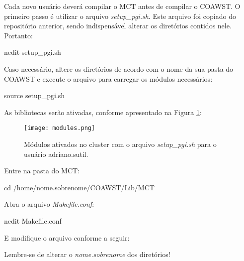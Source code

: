 \noindent Cada novo usuário deverá compilar o MCT antes de compilar o COAWST. O primeiro passo é utilizar o arquivo \textit{setup\_pgi.sh}. Este arquivo foi copiado do repositório anterior, sendo indispensável alterar os diretórios contidos nele.
Portanto:
\bigskip

\begin{bashcode}
nedit setup_pgi.sh
\end{bashcode}
\bigskip

\noindent Caso necessário, altere os diretórios de acordo com o nome da sua pasta do COAWST e execute o arquivo para carregar os módulos necessários:
\bigskip

\begin{bashcode}
source setup_pgi.sh
\end{bashcode}
\bigskip

\noindent As bibliotecas serão ativadas, conforme apresentado na Figura \textcolor{bleu_cite}{\ref{modulos}}:
\bigskip


\begin{figure}[H]
    \centering
    \captionsetup{justification=justified}
    \texttt{[image: modules.png]}
    \caption{Módulos ativados no cluster com o arquivo \textit{setup\_pgi.sh} para o usuário adriano.sutil.}
    \label{modulos}
\end{figure}
\bigskip


\noindent Entre na pasta do MCT:
\bigskip

\begin{bashcode}
cd /home/nome.sobrenome/COAWST/Lib/MCT
\end{bashcode}
\bigskip

\noindent Abra o arquivo \textit{Makefile.conf}:
\bigskip


\begin{bashcode}
nedit Makefile.conf
\end{bashcode}
\bigskip

\noindent E modifique o arquivo conforme a seguir:
\bigskip

\begin{tcolorbox}[enhanced,
  grow to left by=0cm,%
  grow to right by=0cm,%
  enlarge top by=0cm,%
  enlarge bottom by=0cm,%
  tcbox raise base,
  boxrule=1.0pt,
  left=18mm,
  colframe=red!50!black,coltext=red!25!black,colback=red!10!white,
  overlay={\begin{tcbclipinterior}\fill[red!75!blue!50!white] (frame.south west)
    rectangle node[text=white,font=\sffamily\bfseries\footnotesize,rotate=0] {ATENÇÃO} ([xshift=18mm]frame.north west);\end{tcbclipinterior}}]
Lembre-se de alterar o \textit{nome.sobrenome} dos diretórios!
\end{tcolorbox}
\bigskip

